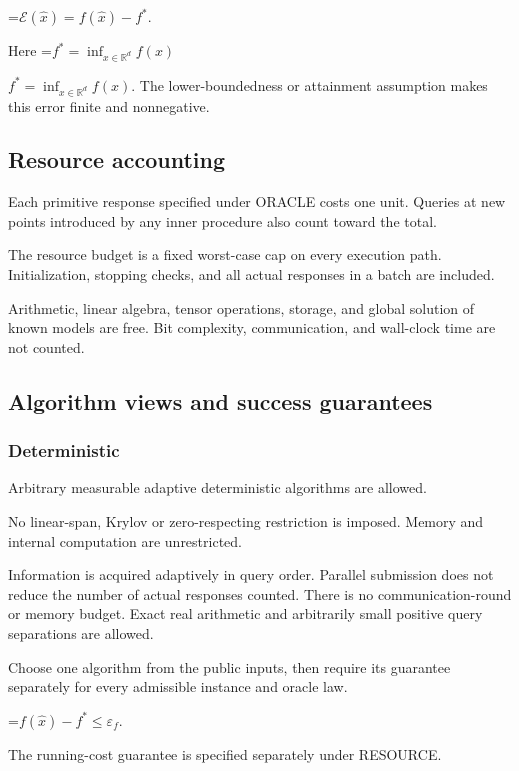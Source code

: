 \documentclass[10pt,a4paper]{article}
\newcommand{\AtlasMath}[1]{\par\begingroup\centering\setbox0=\hbox{$\displaystyle #1$}\ifdim\wd0>1.4\linewidth\typeout{ATLAS WIDE FORMULA: \the\wd0}\fi\ifdim\wd0>\linewidth\resizebox{\linewidth}{!}{\box0}\else\box0\fi\par\endgroup}
\newcommand{\AtlasInlineMath}[1]{\begingroup\setbox0=\hbox{$#1$}\ifdim\wd0>.4\linewidth\endgroup\AtlasMath{#1}\else\endgroup$#1$\fi}
\begin{document}
\AtlasMath{\mathcal{E}(\widehat{x})=f(\widehat{x})-f^*.}




Here \AtlasInlineMath{f^*=\inf_{x\in \mathbb{R}^d}f(x)}. The lower-boundedness or attainment assumption makes this error finite and nonnegative.

\subsection{Resource accounting}
Each primitive response specified under ORACLE costs one unit. Queries at new points introduced by any inner procedure also count toward the total.

The resource budget is a fixed worst-case cap on every execution path. Initialization, stopping checks, and all actual responses in a batch are included.

Arithmetic, linear algebra, tensor operations, storage, and global solution of known models are free. Bit complexity, communication, and wall-clock time are not counted.

\subsection{Algorithm views and success guarantees}
\subsubsection{Deterministic}
Arbitrary measurable adaptive deterministic algorithms are allowed.

No linear-span, Krylov or zero-respecting restriction is imposed. Memory and internal computation are unrestricted.

Information is acquired adaptively in query order. Parallel submission does not reduce the number of actual responses counted. There is no communication-round or memory budget. Exact real arithmetic and arbitrarily small positive query separations are allowed.

Choose one algorithm from the public inputs, then require its guarantee separately for every admissible instance and oracle law.




\AtlasMath{f(\widehat{x})-f^*\le \varepsilon_f.}




The running-cost guarantee is specified separately under RESOURCE.
\end{document}
